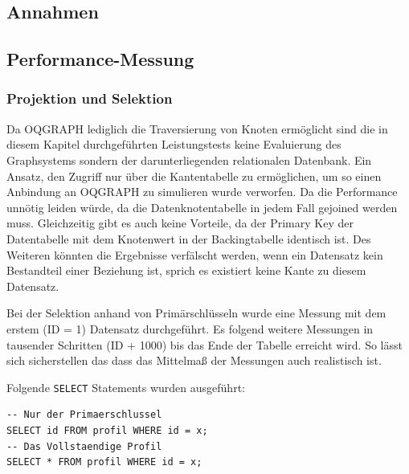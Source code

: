 \subsection{Annahmen}

\subsection{Performance-Messung}

\subsubsection{Projektion und Selektion}
Da OQGRAPH lediglich die Traversierung von Knoten ermöglicht sind die in diesem Kapitel durchgeführten Leistungstests keine Evaluierung des Graphsystems sondern der darunterliegenden relationalen Datenbank. Ein Ansatz, den Zugriff nur über die Kantentabelle zu ermöglichen, um so einen Anbindung an OQGRAPH zu simulieren wurde verworfen. Da die Performance unnötig leiden würde, da die Datenknotentabelle in jedem Fall gejoined werden muss. Gleichzeitig gibt es auch keine Vorteile, da der Primary Key der Datentabelle mit dem Knotenwert in der Backingtabelle identisch ist. Des Weiteren könnten die Ergebnisse verfälscht werden, wenn ein Datensatz kein Bestandteil einer Beziehung ist, sprich es existiert keine Kante zu diesem Datensatz.

Bei der Selektion anhand von Primärschlüsseln wurde eine Messung mit dem erstem (ID = 1) Datensatz durchgeführt. Es folgend weitere Messungen in tausender Schritten (ID + 1000) bis das Ende der Tabelle erreicht wird. So lässt sich sicherstellen das dass das Mittelmaß der Messungen auch realistisch ist.

Folgende \lstinline{SELECT} Statements wurden ausgeführt:
\begin{lstlisting}
-- Nur der Primaerschlussel
SELECT id FROM profil WHERE id = x;
-- Das Vollstaendige Profil
SELECT * FROM profil WHERE id = x;
\end{lstlisting}

